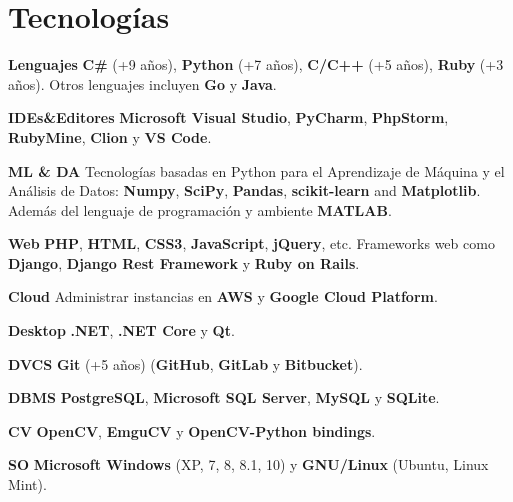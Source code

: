 \documentclass[]{friggeri-cv}
\begin{document}
\section{Tecnologías}
\begin{entrylist}
  \entry
    {\textbf{Lenguajes}}
    {}
    {}
    {\textbf{C\#} (+9 años), \textbf{Python} (+7 años), \textbf{C/C++} (+5 años), \textbf{Ruby} (+3 años). Otros lenguajes incluyen \textbf{Go} y \textbf{Java}.}

  \entry
    {\textbf{IDEs\&Editores}}
    {}
    {}
    {\textbf{Microsoft Visual Studio}, \textbf{PyCharm}, \textbf{PhpStorm}, \textbf{RubyMine}, \textbf{Clion} y \textbf{VS Code}.}

  \entry
    {\textbf{ML \& DA}}
    {}
    {}
    {Tecnologías basadas en Python para el Aprendizaje de Máquina y el Análisis de Datos: \textbf{Numpy}, \textbf{SciPy}, \textbf{Pandas}, \textbf{scikit-learn} and \textbf{Matplotlib}. Además del lenguaje de programación y ambiente \textbf{MATLAB}.}

  \entry
    {\textbf{Web}}
    {}
    {}
    {\textbf{PHP}, \textbf{HTML}, \textbf{CSS3}, \textbf{JavaScript}, \textbf{jQuery}, etc. Frameworks web como \textbf{Django}, \textbf{Django Rest Framework} y \textbf{Ruby on Rails}.}

  \entry
    {\textbf{Cloud}}
    {}
    {}
    {Administrar instancias en \textbf{AWS} y \textbf{Google Cloud Platform}.}

  \entry
    {\textbf{Desktop}}
    {}
    {}
    {\textbf{.NET}, \textbf{.NET Core} y \textbf{Qt}.}

  \entry
    {\textbf{DVCS}}
    {}
    {}
    {\textbf{Git} (+5 años) (\textbf{GitHub}, \textbf{GitLab} y \textbf{Bitbucket}).}
    
  \entry
    {\textbf{DBMS}}
    {}
    {}
    {\textbf{PostgreSQL}, \textbf{Microsoft SQL Server}, \textbf{MySQL} y \textbf{SQLite}.}
    
  \entry
    {\textbf{CV}}
    {}
    {}
    {\textbf{OpenCV}, \textbf{EmguCV} y \textbf{OpenCV-Python bindings}.}    

  \entry
    {\textbf{SO}}
    {}
    {}
    {\textbf{Microsoft Windows} (XP, 7, 8, 8.1, 10) y \textbf{GNU/Linux} (Ubuntu, Linux Mint).}
\end{entrylist}
\\
\end{document}
